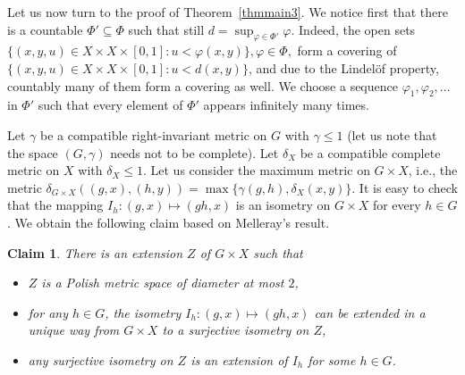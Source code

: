 \documentclass[a4paper]{amsart}
\theoremstyle{plain}
\newtheorem{claim}[theorem]{Claim}
\theoremstyle{remark}
\begin{document}
Let us now turn to the proof of Theorem~\ref{thmmain3}. We notice first that there is a countable $ \Phi' \subseteq \Phi $ such that still $ d = \sup_{\varphi \in \Phi'} \varphi $. Indeed, the open sets $ \{ (x, y, u) \in X \times X \times [0, 1] : u < \varphi(x, y) \}, \varphi \in \Phi, $ form a covering of $ \{ (x, y, u) \in X \times X \times [0, 1] : u < d(x, y) \} $, and due to the Lindel\"{o}f property, countably many of them form a covering as well. We choose a sequence $ \varphi_{1}, \varphi_{2}, \dots $ in $ \Phi' $ such that every element of $ \Phi' $ appears infinitely many times.

Let $ \gamma $ be a compatible right-invariant metric on $ G $ with $ \gamma \leq 1 $ (let us note that the space $ (G, \gamma) $ needs not to be complete). Let $ \delta_{X} $ be a compatible complete metric on $ X $ with $ \delta_{X} \leq 1 $. Let us consider the maximum metric on $ G \times X $, i.e., the metric $ \delta_{G \times X}((g, x), (h, y)) = \max \{ \gamma(g, h), \delta_{X}(x, y) \} $. It is easy to check that the mapping $ I_{h} : (g, x) \mapsto (gh, x) $ is an isometry on $ G \times X $ for every $ h \in G $. We obtain the following claim based on Melleray's result.


\begin{claim} \label{cl1}
There is an extension $ Z $ of $ G \times X $ such that
\begin{itemize}
\item $ Z $ is a Polish metric space of diameter at most $ 2 $,
\item for any $ h \in G $, the isometry $ I_{h} : (g, x) \mapsto (gh, x) $ can be extended in a unique way from $ G \times X $ to a surjective isometry on $ Z $,
\item any surjective isometry on $ Z $ is an extension of $ I_{h} $ for some $ h \in G $.
\end{itemize}
\end{claim}
\end{document}
